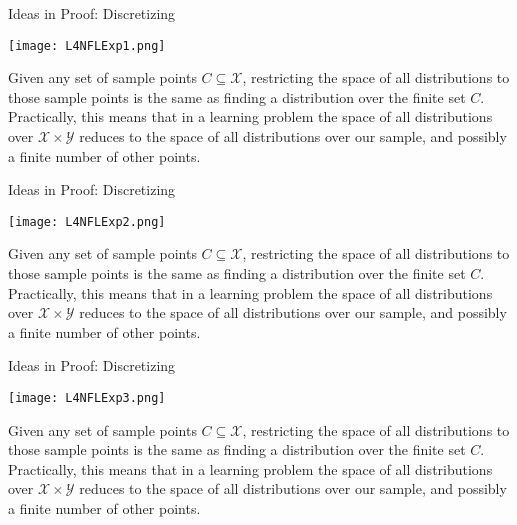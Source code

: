 \documentclass[10pt, table, dvipsnames,handout]{beamer}
\newcommand{\cX}{\ensuremath{\mathcal{X}}}
\newcommand{\cY}{\ensuremath{\mathcal{Y}}}
\begin{document}
\begin{frame}[fragile]{Ideas in Proof: Discretizing}
  \begin{minipage}[t][0.5\textheight][t]{\textwidth}
	  \centering \texttt{[image: L4NFLExp1.png]}
  \end{minipage}
  \vfill
  \begin{minipage}[t][0.5\textheight][t]{\textwidth}
Given any set of sample points $C\subseteq \cX$, restricting the space of all distributions to those sample points is the same as finding a distribution over the finite set $C$. Practically, this means that in a learning problem the space of all distributions over $\cX\times \cY$ reduces to the space of all distributions over our sample, and possibly a finite number of other points. 
\end{minipage}

\end{frame}



\begin{frame}[fragile]{Ideas in Proof: Discretizing}
  \begin{minipage}[t][0.5\textheight][t]{\textwidth}
	  \centering \texttt{[image: L4NFLExp2.png]}
  \end{minipage}
  \vfill
  \begin{minipage}[t][0.5\textheight][t]{\textwidth}
Given any set of sample points $C\subseteq \cX$, restricting the space of all distributions to those sample points is the same as finding a distribution over the finite set $C$. Practically, this means that in a learning problem the space of all distributions over $\cX\times \cY$ reduces to the space of all distributions over our sample, and possibly a finite number of other points. 
\end{minipage}

\end{frame}




\begin{frame}[fragile]{Ideas in Proof: Discretizing}
  \begin{minipage}[t][0.5\textheight][t]{\textwidth}
	  \centering \texttt{[image: L4NFLExp3.png]}
  \end{minipage}
  \vfill
  \begin{minipage}[t][0.5\textheight][t]{\textwidth}
Given any set of sample points $C\subseteq \cX$, restricting the space of all distributions to those sample points is the same as finding a distribution over the finite set $C$. Practically, this means that in a learning problem the space of all distributions over $\cX\times \cY$ reduces to the space of all distributions over our sample, and possibly a finite number of other points. 
\end{minipage}

\end{frame}
\end{document}
